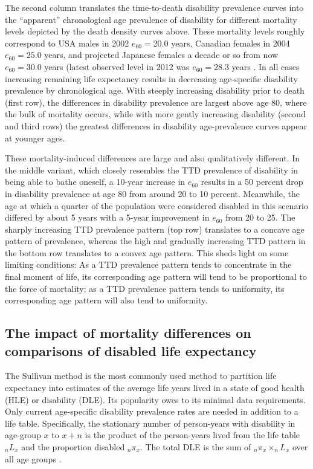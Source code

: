 \documentclass[12pt,oneside,a4paper]{article} %
\begin{document}
The second column translates the time-to-death disability prevalence curves into
the ``apparent'' chronological age prevalence of disability for different
mortality levels depicted by the death density curves above. These mortality
levels roughly correspond to USA males in 2002 $e_{60} = 20.0$ years, Canadian
females in 2004 $e_{60} = 25.0$ years, and projected Japanese females a decade
or so from now $e_{60} = 30.0$ years (latest observed level in 2012 was $e_{60}
= 28.3$ years \citep{HMD2018}. In all cases increasing remaining life
expectancy results in decreasing age-specific disability prevalence by
chronological age. With steeply increasing disability prior to death (first
row), the differences in disability prevalence are largest above age 80, where
the bulk of mortality occurs, while with more gently increasing disability
(second and third rows) the greatest differences in disability age-prevalence
curves appear at younger ages.

These mortality-induced differences are large and also qualitatively different. In the middle variant, which closely resembles the TTD prevalence of disability in being able to bathe oneself, a 10-year increase in $e_{60}$ results in a 50 percent drop in disability prevalence at age 80 from around 20 to 10 percent. Meanwhile, the age at which a quarter of the population were considered disabled in this scenario differed by about 5 years with a 5-year improvement in $e_{60}$ from 20 to 25. The sharply increasing TTD prevalence pattern (top row) translates to a concave age pattern of prevalence, whereas the high and gradually increasing TTD pattern in the bottom row translates to a convex age pattern. This sheds light on some limiting conditions: As a TTD prevalence pattern tends to concentrate in the final moment of life, its corresponding age pattern will tend to be proportional to the force of mortality; as a TTD prevalence pattern tends to uniformity, its corresponding age pattern will also tend to uniformity.

\FloatBarrier
\subsection{The impact of mortality differences on comparisons of disabled life expectancy}
\label{sec:bounds}
The Sullivan method is the most commonly used method to partition life
expectancy into estimates of the average life years lived in a state of good
health (HLE) or disability (DLE). Its popularity owes to its minimal data
requirements. Only current age-specific disability prevalence rates are needed
in addition to a life table. Specifically, the stationary
number of person-years with disability in
age-group $x$ to $x+n$ is the product of the person-years lived from the life
table $_{n}L _{x}$ and the proportion disabled $_{n}\pi _{x}$. The total DLE is
the sum of  $_{n}\pi _{x} \times _{n}L _{x}$ over all age groups
\citep{Sullivan1970}.
\end{document}
